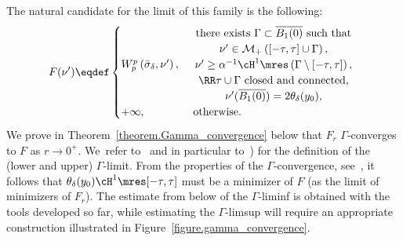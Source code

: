 The natural candidate for the limit of this family is the following:
\begin{equation}\label{Gamma_limitF}
F(\nu') \eqdef
\begin{cases}
W_p^p\left( \bar \sigma_{\delta}, \nu' \right),&
\begin{array}{c}
\text{there exists $\Gamma \subset \overline{B_1(0)}$ such that}\\
\nu' \in \mathcal{M}_+\left([-\tau, \tau] \cup \Gamma\right),
\\ \nu' \ge \alpha^{-1}\cH^1\mres \left(\Gamma\setminus[-\tau,\tau]\right),\\
\RR\tau \cup \Gamma \text{ closed and connected},\\ \nu'(\overline{B_1(0)}) = 2\theta_\delta(y_0),
\end{array} \\
+\infty,& \text{ otherwise.}
\end{cases}
\end{equation}
We prove in Theorem~\ref{theorem.Gamma_convergence} below that $F_r$ $\Gamma$-converges to $F$ as $r\to 0^+$. We~refer to~\cite{dal_maso_introduction_1993,braides_gamma-convergence_2002} and in particular to~\cite[Def.\,1.24]{braides_gamma-convergence_2002}) for the definition of the (lower and upper) $\Gamma$-limit. From the properties of the $\Gamma$-convergence, see~\cite[Cor.\,7.20]{dal_maso_introduction_1993}, it follows that $\theta_\delta(y_0)\cH^1\mres [-\tau, \tau]$ must be a minimizer of $F$ (as the limit of minimizers of $F_r$). The estimate from below of the $\Gamma$-liminf is obtained with the tools developed so far, while estimating the $\Gamma$-limsup will require an appropriate construction illustrated in Figure~\ref{figure.gamma_convergence}.

